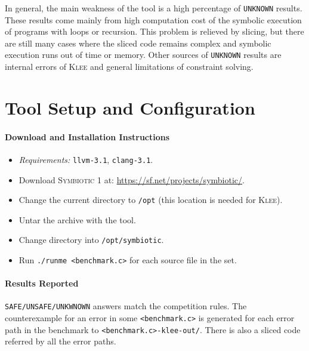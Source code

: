 \documentclass[10pt]{llncs}
\newcommand\tool{\textsc{Symbiotic}\xspace}
\begin{document}
In general, the main weakness of the tool is a high percentage of
\texttt{UNKNOWN} results. These results come mainly from high computation
cost of the symbolic execution of programs with loops or recursion. This
problem is relieved by slicing, but there are still many cases where the
sliced code remains complex and symbolic execution runs out of time or
memory. Other sources of \texttt{UNKNOWN} results are internal errors of
\textsc{Klee} and general limitations of constraint solving.




\section{Tool Setup and Configuration}
\paragraph{Download and Installation Instructions}
\begin{itemize}
\item \emph{Requirements:} \texttt{llvm-3.1}, \texttt{clang-3.1}.
\item Download \tool 1 at: \url{https://sf.net/projects/symbiotic/}.
\item Change the current directory to \texttt{/opt} (this location is
	needed for \textsc{Klee}).
\item Untar the archive with the tool.
\item Change directory into \texttt{/opt/symbiotic}.
\item Run \texttt{./runme <benchmark.c>} for each source file in the set.
\end{itemize}

\paragraph{Results Reported} \texttt{SAFE/UNSAFE/UNKWNOWN} answers match
the competition rules. The counterexample for an error in some
\texttt{<benchmark.c>} is generated for each error path in the benchmark to
\texttt{<benchmark.c>-klee-out/}. There is also a sliced code referred by all
the error paths.
\end{document}
